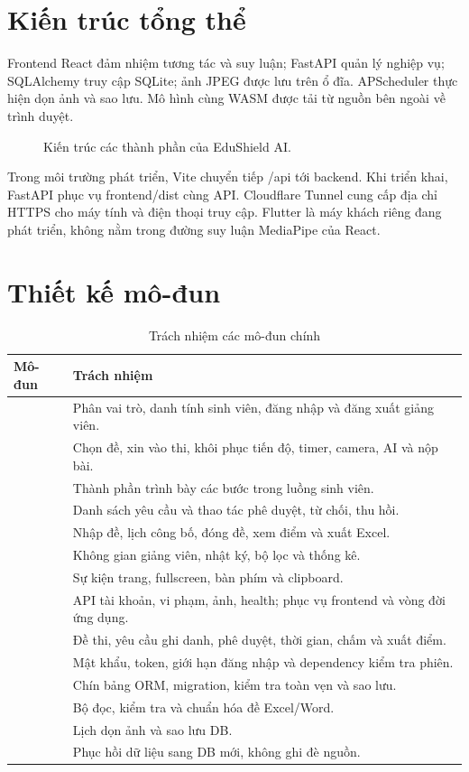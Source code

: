 \clearpage
\section{Kiến trúc tổng thể}
Frontend React đảm nhiệm tương tác và suy luận; FastAPI quản lý nghiệp vụ; SQLAlchemy truy cập SQLite; ảnh JPEG được lưu trên ổ đĩa. APScheduler thực hiện dọn ảnh và sao lưu. Mô hình cùng WASM được tải từ nguồn bên ngoài về trình duyệt.
\begin{figure}[H]\centering
\caption{Kiến trúc các thành phần của EduShield AI.}\end{figure}

Trong môi trường phát triển, Vite chuyển tiếp /api tới backend. Khi triển khai, FastAPI phục vụ frontend/dist cùng API. Cloudflare Tunnel cung cấp địa chỉ HTTPS cho máy tính và điện thoại truy cập. Flutter là máy khách riêng đang phát triển, không nằm trong đường suy luận MediaPipe của React.

\section{Thiết kế mô-đun}
\begin{longtable}{@{}L{5.2cm}L{9.8cm}@{}}
\caption{Trách nhiệm các mô-đun chính}\\
\toprule Mô-đun & Trách nhiệm \\\midrule\endhead
{} & Phân vai trò, danh tính sinh viên, đăng nhập và đăng xuất giảng viên.\\
 & Chọn đề, xin vào thi, khôi phục tiến độ, timer, camera, AI và nộp bài.\\
 & Thành phần trình bày các bước trong luồng sinh viên.\\
 & Danh sách yêu cầu và thao tác phê duyệt, từ chối, thu hồi.\\
 & Nhập đề, lịch công bố, đóng đề, xem điểm và xuất Excel.\\
 & Không gian giảng viên, nhật ký, bộ lọc và thống kê.\\
 & Sự kiện trang, fullscreen, bàn phím và clipboard.\\
 & API tài khoản, vi phạm, ảnh, health; phục vụ frontend và vòng đời ứng dụng.\\
 & Đề thi, yêu cầu ghi danh, phê duyệt, thời gian, chấm và xuất điểm.\\
 & Mật khẩu, token, giới hạn đăng nhập và dependency kiểm tra phiên.\\
 & Chín bảng ORM, migration, kiểm tra toàn vẹn và sao lưu.\\
 & Bộ đọc, kiểm tra và chuẩn hóa đề Excel/Word.\\
 & Lịch dọn ảnh và sao lưu DB.\\
 & Phục hồi dữ liệu sang DB mới, không ghi đè nguồn.\\
\bottomrule
\end{longtable}

